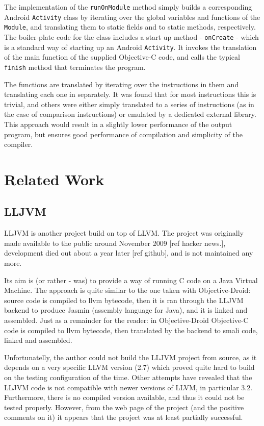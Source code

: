 \documentclass[parskip]{cs4rep}
\begin{document}
The implementation of the {\tt runOnModule} method simply builds a corresponding Android {\tt Activity} class by iterating over the global variables and functions of the {\tt Module}, and translating them to static fields and to static methods, respectively. The boiler-plate code for the class includes a start up method - {\tt onCreate} - which is a standard way of starting up an Android {\tt Activity}. It invokes the translation of the main function of the supplied Objective-C code, and calls the typical {\tt finish} method that terminates the program.

The functions are translated by iterating over the instructions in them and translating each one in separately. It was found that for most instructions this is trivial, and others were either simply translated to a series of instructions (as in the case of comparison instructions) or emulated by a dedicated external library. This approach would result in a slightly lower performance of the output program, but ensures good performance of compilation and simplicity of the compiler.

\chapter{Related Work}

\section{LLJVM}

LLJVM is another project build on top of LLVM. The project was originally made available to the public around November 2009 [ref hacker news.], development died out about a year later [ref github], and is not maintained any more.

Its aim is (or rather - was) to provide a way of running C code on a Java Virtual Machine. The approach is quite similar to the one taken with Objective-Droid: source code is compiled to llvm bytecode, then it is ran through the LLJVM backend to produce Jasmin (assembly language for Java), and it is linked and assembled. Just as a remainder for the reader: in Objective-Droid Objective-C code is compiled to llvm bytecode, then translated by the backend to smali code, linked and assembled.

Unfortunatelly, the author could not build the LLJVM project from source, as it depends on a very specific LLVM version (2.7) which proved quite hard to build on the testing configuration of the time. Other attempts have revealed that the LLJVM code is not compatible with newer versions of LLVM, in particular 3.2. Furthermore, there is no compiled version available, and thus it could not be tested properly. However, from the web page of the project (and the positive comments on it) it appears that the project was at least partially successful.
\end{document}
